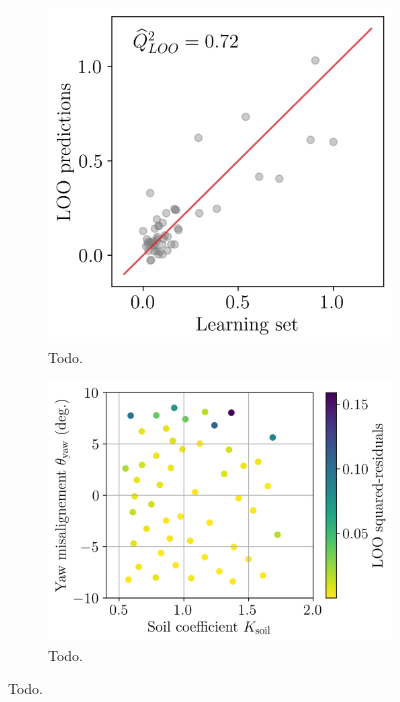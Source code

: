 \begin{figure}
    \centering
    \begin{subfigure}[t]{0.42\linewidth}
        \includegraphics[width=\linewidth]{./part3/figures/OWT/loo_qqplot.png}
        \caption{Todo.}
    \end{subfigure}
    \begin{subfigure}[t]{0.55\linewidth}
        \includegraphics[width=\linewidth]{./part3/figures/OWT/loo_squared_res.png}
        \caption{Todo.}
    \end{subfigure}
    \label{fig:loo_validation}
    \caption{Todo.}
\end{figure}


